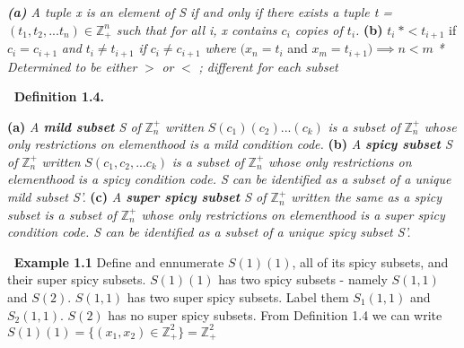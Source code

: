 \documentclass[12pt]{article}
\begin{document}
\begin{adjustwidth}{2.5em}{0pt}
	\textit{\textbf{(a)} A tuple x is an element of S if and only if there exists a tuple t = \((t_1,t_2,...t_n) \in \mathbb{Z}_+^n\) such that for all i, x contains \(c_i\) copies of \(t_i\).}
	\newline
	\newline
 \textbf{(b) } \(t_i\ *< t_{i+1}\) if \(c_i = c_{i+1}\) \textit{ and } \(t_i \neq t_{i+1}\) \textit{ if } \(c_i \neq c_{i+1}\) \textit{where} \((x_n = t_i\) and \(x_m = t_{i+1}) \implies n < m\)
 \newline
 \textit{* Determined to be either} \(>\) \textit{ or } \(<\) \textit{; different for each subset}
\end{adjustwidth}
\(\ \)
\newline
\textbf{Definition 1.4.}
\begin{adjustwidth}{2.5em}{0pt}
	\textbf{(a)}\textit{ A \textbf{mild subset} S of }\(\mathbb{Z}_n^+\)\textit{ written }\(S(c_1)(c_2)...(c_k)\) \textit{ is a subset of }\(\mathbb{Z}_n^+\) \textit{ whose only restrictions on elementhood is a mild condition code.}
	\newline
	\textbf{(b)}\textit{ A \textbf{spicy subset} S of }\(\mathbb{Z}_n^+\)\textit{ written }\(S(c_1,c_2,...c_k)\) \textit{ is a subset of }\(\mathbb{Z}_n^+\) \textit{ whose only restrictions on elementhood is a spicy condition code. S can be identified as a subset of a unique mild subset S'.}
	\newline
	\textbf{(c)}\textit{ A \textbf{super spicy subset} S of \(\mathbb{Z}_n^+\)\textit{ written the same as a spicy subset is a subset of }\(\mathbb{Z}_n^+\) \textit{ whose only restrictions on elementhood is a super spicy condition code. S can be identified as a subset of a unique spicy subset S'.}}
\end{adjustwidth}
\(\ \)
\newline
\textbf{Example 1.1} \newline
Define and ennumerate \(S(1)(1)\), all of its spicy subsets, and their super spicy subsets.
\newline
\(S(1)(1)\) has two spicy subsets - namely \(S(1,1)\) and \(S(2)\). \newline
\(S(1,1)\) has two super spicy subsets. Label them \(S_1(1,1)\) and \(S_2(1,1)\). \newline \(S(2)\) has no super spicy subsets. \newline
From Definition 1.4 we can write \newline
\(S(1)(1)=\{(x_1,x_2)\in \mathbb{Z}_+^2\}=\mathbb{Z}_+^2\) \newline
\end{document}
